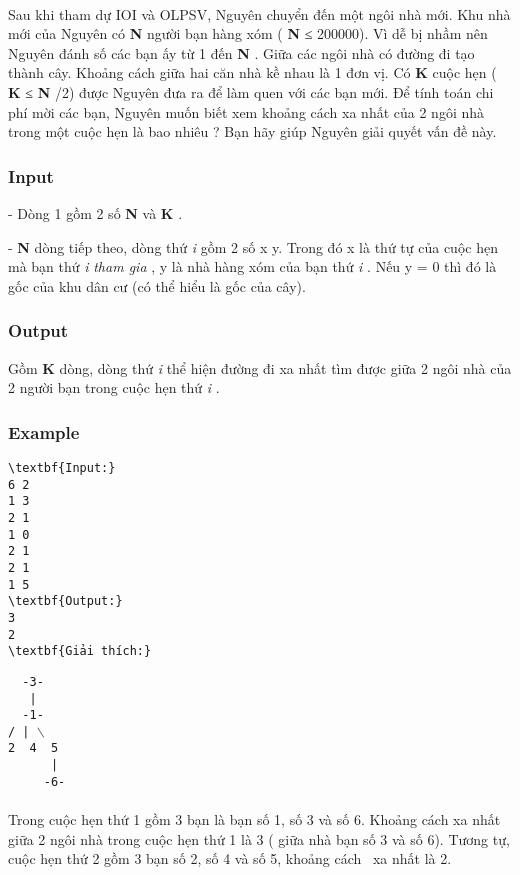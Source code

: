 

 

Sau khi tham dự IOI và OLPSV, Nguyên chuyển đến một ngôi nhà mới. Khu nhà mới của Nguyên có \textbf{ N } người bạn hàng xóm ( \textbf{ N } ≤ 200000). Vì dễ bị nhầm nên Nguyên đánh số các bạn ấy từ 1 đến \textbf{ N } . Giữa các ngôi nhà có đường đi tạo thành cây. Khoảng cách giữa hai căn nhà kề nhau là 1 đơn vị. Có \textbf{ K } cuộc hẹn ( \textbf{ K } ≤ \textbf{ N } /2) được Nguyên đưa ra để làm quen với các bạn mới. Để tính toán chi phí mời các bạn, Nguyên muốn biết xem khoảng cách xa nhất của 2 ngôi nhà trong một cuộc hẹn là bao nhiêu ? Bạn hãy giúp Nguyên giải quyết vấn đề này.

\subsubsection{Input}

- Dòng 1 gồm 2 số \textbf{ N } và \textbf{ K } .

- \textbf{ N } dòng tiếp theo, dòng thứ \emph{ i } gồm 2 số x y. Trong đó x là thứ tự của cuộc hẹn mà bạn thứ \emph{ i }\emph{ tham gia } , y là nhà hàng xóm của bạn thứ \emph{ i } . Nếu y = 0 thì đó là gốc của khu dân cư (có thể hiểu là gốc của cây).

\subsubsection{Output}

Gồm \textbf{ K } dòng, dòng thứ \emph{ i } thể hiện đường đi xa nhất tìm được giữa 2 ngôi nhà của 2 người bạn trong cuộc hẹn thứ \emph{ i } .

\subsubsection{Example}
\begin{verbatim}
\textbf{Input:}
6 2
1 3
2 1
1 0
2 1
2 1
1 5
\textbf{Output:}
3
2
\textbf{Giải thích:}\end{verbatim}


\texttt{  -3-
\\   |
\\  -1-
\\/ | $\backslash$
\\2  4  5
\\      |
\\     -6-}
\\
\\​Trong cuộc hẹn thứ 1 gồm 3 bạn là bạn số 1, số 3 và số 6. Khoảng cách xa nhất giữa 2 ngôi nhà trong cuộc hẹn thứ 1 là 3 ( giữa nhà bạn số 3 và số 6). Tương tự, cuộc hẹn thứ 2 gồm 3 bạn số 2, số 4 và số 5, khoảng cách  xa nhất là 2.

 

 

 

 

 

 